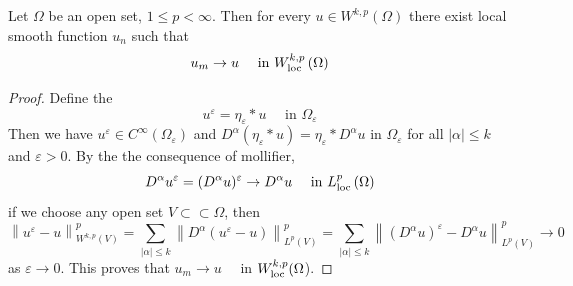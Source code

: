 \begin{lemma}
    Let $\Omega$ be an open set, $1 \leq p < \infty$.
    Then for every $u \in W^{k, p}\left(\Omega\right)$ there exist local smooth function $u_n$ such that
    \begin{equation*}
        u_m \rightarrow u \quad \text{ in } W_{\operatorname{\operatorname{loc}}}^{k, p}\left(\Omega\right)
    \end{equation*}
    \begin{proof}
        Define the
        \begin{equation*}
            u^{\varepsilon}=\eta_{\varepsilon} * u \quad \text { in } \Omega_{\varepsilon}
        \end{equation*}
        Then we have $u^{\varepsilon} \in C^{\infty}\left(\Omega_{\varepsilon}\right)$
        and $D^\alpha \left(\eta_{\varepsilon} * u\right)=\eta_{\varepsilon} * D^\alpha u $
        in $\Omega_{\varepsilon}$ for all $\left|\alpha\right|\leq k$ and $\varepsilon>0$.
        By the the consequence of mollifier,
        \begin{equation*}
            D^\alpha u^{\varepsilon}
            =
            (D^\alpha u)^{\varepsilon}
            \rightarrow
            D^\alpha u \quad \text{ in }L^p_{\operatorname{\operatorname{loc}}}\left(\Omega\right)
        \end{equation*}
        if we choose any open set $V \subset \subset \Omega$, then
        \begin{equation*}
            \left\|u^{\varepsilon}-u\right\|_{W^{k, p}(V)}^p
            =
            \sum_{\left|\alpha\right| \leq k}\left\|D^\alpha (u^{\varepsilon}- u)\right\|_{L^p(V)}^p
            =\sum_{\left|\alpha\right| \leq k}\left\|(D^\alpha u)^{\varepsilon}-D^\alpha u\right\|_{L^p(V)}^p
            \rightarrow 0
        \end{equation*}
        as $\varepsilon \rightarrow 0$. This proves that $u_m \rightarrow u \quad$ in $W_{\operatorname{\operatorname{loc}}}^{k, p}(\Omega$).
    \end{proof}
\end{lemma}

